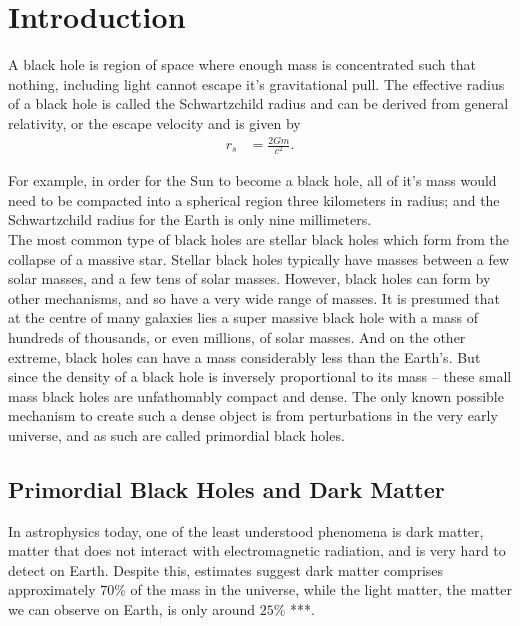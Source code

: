 %
%
%
%
%

\chapter{Introduction}

A black hole is region of space where enough mass is concentrated such that nothing, including light cannot escape it's gravitational pull. The effective radius of a black hole is called the Schwartzchild radius and can be derived from general relativity, or the escape velocity and is given by
\begin{align*}
r_s &= \frac{2Gm}{c^2}.
\end{align*}

For example, in order for the Sun to become a black hole, all of it's mass would need to be compacted into a spherical region three kilometers in radius; and the Schwartzchild radius for the Earth is only nine millimeters. \\

The most common type of black holes are stellar black holes which form from the collapse of a massive star. Stellar black holes typically have masses between a few solar masses, and a few tens of solar masses. However, black holes can form by other mechanisms, and so have a very wide range of masses. It is presumed that at the centre of many galaxies lies a super massive black hole with a mass of hundreds of thousands, or even millions, of solar masses. And on the other extreme, black holes can have a mass considerably less than the Earth's. But since the density of a black hole is inversely proportional to its mass -- these small mass black holes are unfathomably compact and dense. The only known possible mechanism to create such a dense object is from perturbations in the very early universe, and as such are called primordial black holes.

\section{Primordial Black Holes and Dark Matter}

In astrophysics today, one of the least understood phenomena is dark matter, matter that does not interact with electromagnetic radiation, and is very hard to detect on Earth. Despite this, estimates suggest dark matter comprises approximately $70\%$ of the mass in the universe, while the light matter, the matter we can observe on Earth, is only around $25\%$ ***. \\

